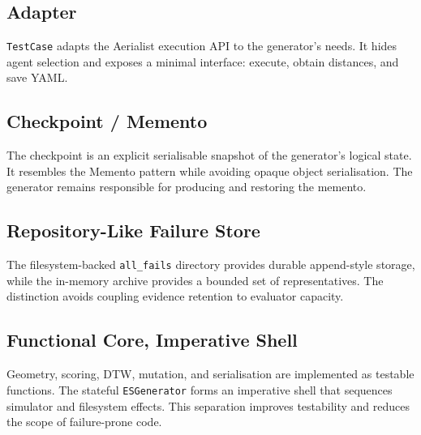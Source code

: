 \documentclass[11pt,a4paper]{report}
\newcommand{\code}[1]{\texttt{#1}}
\begin{document}
\subsection{Adapter}
\code{TestCase} adapts the Aerialist execution API to the generator's needs. It hides agent selection and exposes a minimal interface: execute, obtain distances, and save YAML.

\subsection{Checkpoint / Memento}
The checkpoint is an explicit serialisable snapshot of the generator's logical state. It resembles the Memento pattern while avoiding opaque object serialisation. The generator remains responsible for producing and restoring the memento.

\subsection{Repository-Like Failure Store}
The filesystem-backed \code{all\_fails} directory provides durable append-style storage, while the in-memory archive provides a bounded set of representatives. The distinction avoids coupling evidence retention to evaluator capacity.

\subsection{Functional Core, Imperative Shell}
Geometry, scoring, DTW, mutation, and serialisation are implemented as testable functions. The stateful \code{ESGenerator} forms an imperative shell that sequences simulator and filesystem effects. This separation improves testability and reduces the scope of failure-prone code.
\end{document}
